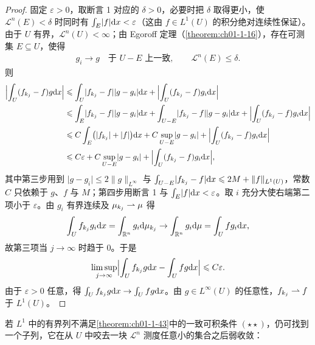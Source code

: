 \documentclass[../../main.tex]{subfiles}%
\begin{document}
\begin{proof}
固定 $\varepsilon>0$，取断言 1 对应的 $\delta>0$，必要时把 $\delta$ 取得更小，使 $\mathcal{L}^n(E)<\delta$ 时同时有 $\int_E\lvert f\rvert\mathrm{d} x<\varepsilon$（这由 $f\in L^1(U)$ 的积分绝对连续性保证）。由于 $U$ 有界，$\mathcal{L}^n(U)<\infty$；由 Egoroff 定理（\cref{theorem:ch01-1-16}），存在可测集 $E\subseteq U$，使得%
\begin{align*}
g_i\to g\quad\text{于 }U-E\text{ 上一致},\qquad\mathcal{L}^n(E)\leqslant\delta .
\end{align*}
则
\begin{align*}
\Bigl\lvert\int_U(f_{k_j}-f)g\mathrm{d} x\Bigr\rvert
&\leqslant\int_U\lvert f_{k_j}-f\rvert\lvert g-g_i\rvert\mathrm{d} x+\Bigl\lvert\int_U(f_{k_j}-f)g_i\mathrm{d} x\Bigr\rvert\\
&\leqslant\int_E\lvert f_{k_j}-f\rvert\lvert g-g_i\rvert\mathrm{d} x+\int_{U-E}\lvert f_{k_j}-f\rvert\lvert g-g_i\rvert\mathrm{d} x+\Bigl\lvert\int_U(f_{k_j}-f)g_i\mathrm{d} x\Bigr\rvert\\
&\leqslant C\int_E\bigl(\lvert f_{k_j}\rvert+\lvert f\rvert\bigr)\mathrm{d} x+C\sup_{U-E}\lvert g-g_i\rvert+\Bigl\lvert\int_U(f_{k_j}-f)g_i\mathrm{d} x\Bigr\rvert\\
&\leqslant C\varepsilon+C\sup_{U-E}\lvert g-g_i\rvert+\Bigl\lvert\int_U(f_{k_j}-f)g_i\mathrm{d} x\Bigr\rvert,
\end{align*}
其中第三步用到 $\lvert g-g_i\rvert\leqslant2\lVert g\rVert_{L^\infty}$ 与 $\int_{U-E}\lvert f_{k_j}-f\rvert\mathrm{d} x\leqslant2M+\lVert f\rVert_{L^1(U)}$，常数 $C$ 只依赖于 $g$、$f$ 与 $M$；第四步用断言 1 与 $\int_E\lvert f\rvert\mathrm{d} x<\varepsilon$。取 $i$ 充分大使右端第二项小于 $\varepsilon$。由 $g_i$ 有界连续及 $\mu_{k_j}\rightharpoonup\mu$ 得
\begin{align*}
\int_Uf_{k_j}g_i\mathrm{d} x=\int_{\mathbb{R}^n}g_i\mathrm{d}\mu_{k_j}\to\int_{\mathbb{R}^n}g_i\mathrm{d}\mu=\int_Ufg_i\mathrm{d} x,
\end{align*}
故第三项当 $j\to\infty$ 时趋于 $0$。于是
\begin{align*}
\limsup_{j\to\infty}\Bigl\lvert\int_Uf_{k_j}g\mathrm{d} x-\int_Ufg\mathrm{d} x\Bigr\rvert\leqslant C\varepsilon .
\end{align*}
由于 $\varepsilon>0$ 任意，得 $\int_Uf_{k_j}g\mathrm{d} x\to\int_Ufg\mathrm{d} x$。由 $g\in L^\infty(U)$ 的任意性，$f_{k_j}\rightharpoonup f$ 于 $L^1(U)$。
\end{proof}

若 $L^1$ 中的有界列不满足\cref{theorem:ch01-1-43}中的一致可积条件 $(\star\star)$，仍可找到一个子列，它在从 $U$ 中咬去一块 $\mathcal{L}^n$ 测度任意小的集合之后弱收敛：%
\end{document}
